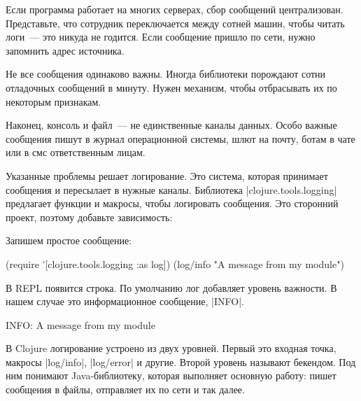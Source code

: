 Если программа работает на многих серверах, сбор сообщений
централизован. Представьте, что сотрудник переключается между сотней машин,
чтобы читать логи~--- это никуда не годится. Если сообщение пришло по сети,
нужно запомнить адрес источника.

Не все сообщения одинаково важны. Иногда библиотеки порождают сотни отладочных
сообщений в минуту. Нужен механизм, чтобы отбрасывать их по некоторым признакам.

Наконец, консоль и файл~--- не единственные каналы данных. Особо важные
сообщения пишут в журнал операционной системы, шлют на почту, ботам в чате или в
смс ответственным лицам.

Указанные проблемы решает логирование. Это система, которая принимает сообщения
и пересылает в нужные каналы. Библиотека \spverb|clojure.tools.logging|
предлагает функции и макросы, чтобы логировать сообщения. Это сторонний проект,
поэтому добавьте зависимость:


\begin{english}
  \begin{clojure}
  \end{clojure}
\end{english}

\noindent
Запишем простое сообщение:

\begin{english}
  \begin{clojure}
(require '[clojure.tools.logging :as log])
(log/info "A message from my module")
  \end{clojure}
\end{english}

\noindent
В REPL появится строка. По умолчанию лог добавляет уровень важности. В нашем
случае это информационное сообщение, \spverb|INFO|.

\begin{english}
  \begin{text}
INFO: A message from my module
  \end{text}
\end{english}

В Clojure логирование устроено из двух уровней. Первый это входная точка,
макросы \spverb|log/info|, \spverb|log/error| и другие. Второй уровень называют
бекендом. Под ним понимают Java-библиотеку, которая выполняет основную работу:
пишет сообщения в файлы, отправляет их по сети и так далее.

